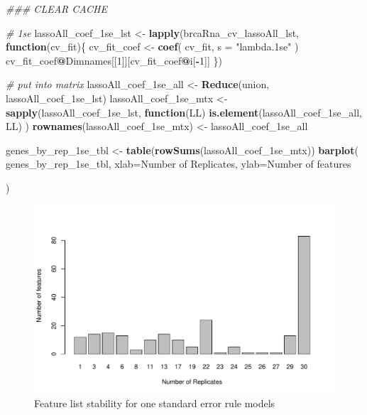 \documentclass[
]{book}
\newenvironment{Shaded}{\begin{snugshade}}{\end{snugshade}}
\newcommand{\CommentTok}[1]{\textcolor[rgb]{0.56,0.35,0.01}{\textit{#1}}}
\newcommand{\ControlFlowTok}[1]{\textcolor[rgb]{0.13,0.29,0.53}{\textbf{#1}}}
\newcommand{\DataTypeTok}[1]{\textcolor[rgb]{0.13,0.29,0.53}{#1}}
\newcommand{\DecValTok}[1]{\textcolor[rgb]{0.00,0.00,0.81}{#1}}
\newcommand{\KeywordTok}[1]{\textcolor[rgb]{0.13,0.29,0.53}{\textbf{#1}}}
\newcommand{\NormalTok}[1]{#1}
\newcommand{\OperatorTok}[1]{\textcolor[rgb]{0.81,0.36,0.00}{\textbf{#1}}}
\newcommand{\StringTok}[1]{\textcolor[rgb]{0.31,0.60,0.02}{#1}}
\begin{document}
\begin{Shaded}
\begin{Highlighting}[]
\CommentTok{\#\#\# CLEAR CACHE}


\CommentTok{\# 1se}
\NormalTok{lassoAll\_coef\_1se\_lst <{-}}\StringTok{ }\KeywordTok{lapply}\NormalTok{(brcaRna\_cv\_lassoAll\_lst, }\ControlFlowTok{function}\NormalTok{(cv\_fit)\{}
\NormalTok{ cv\_fit\_coef <{-}}\StringTok{ }\KeywordTok{coef}\NormalTok{(}
\NormalTok{ cv\_fit,}
 \DataTypeTok{s =} \StringTok{"lambda.1se"}
\NormalTok{ )}
\NormalTok{ cv\_fit\_coef}\OperatorTok{@}\NormalTok{Dimnames[[}\DecValTok{1}\NormalTok{]][cv\_fit\_coef}\OperatorTok{@}\NormalTok{i[}\OperatorTok{{-}}\DecValTok{1}\NormalTok{]]}
\NormalTok{ \})}

\CommentTok{\# put into matrix}
\NormalTok{lassoAll\_coef\_1se\_all <{-}}\StringTok{ }\KeywordTok{Reduce}\NormalTok{(union, lassoAll\_coef\_1se\_lst)}
\NormalTok{lassoAll\_coef\_1se\_mtx <{-}}\StringTok{ }\KeywordTok{sapply}\NormalTok{(lassoAll\_coef\_1se\_lst, }
  \ControlFlowTok{function}\NormalTok{(LL) }\KeywordTok{is.element}\NormalTok{(lassoAll\_coef\_1se\_all, LL)}
\NormalTok{)}
\KeywordTok{rownames}\NormalTok{(lassoAll\_coef\_1se\_mtx) <{-}}\StringTok{ }\NormalTok{lassoAll\_coef\_1se\_all}

\NormalTok{genes\_by\_rep\_1se\_tbl <{-}}\StringTok{ }\KeywordTok{table}\NormalTok{(}\KeywordTok{rowSums}\NormalTok{(lassoAll\_coef\_1se\_mtx))}
\KeywordTok{barplot}\NormalTok{(}
\NormalTok{ genes\_by\_rep\_1se\_tbl,}
 \DataTypeTok{xlab=}\StringTok{\textquotesingle{}Number of Replicates\textquotesingle{}}\NormalTok{,}
 \DataTypeTok{ylab=}\StringTok{\textquotesingle{}Number of features\textquotesingle{}}

\NormalTok{)}
\end{Highlighting}
\end{Shaded}

\begin{figure}
\centering
\includegraphics{Static/figures/brca-rnaseq-feature-list-1se-1.pdf}
\caption{\label{fig:brca-rnaseq-feature-list-1se}Feature list stability for one standard error rule models}
\end{figure}
\end{document}
